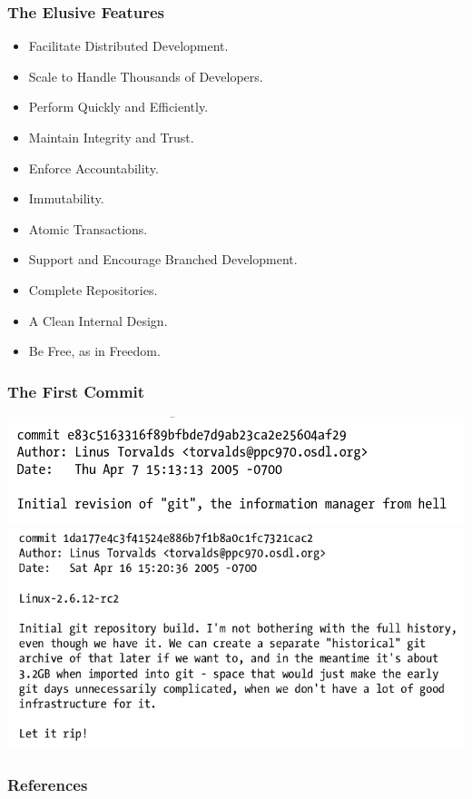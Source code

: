 \documentclass[22pt]{beamer}
\begin{document}
\begin{frame}
    \frametitle{The Elusive Features}
    \begin{itemize}
        \item Facilitate Distributed Development.
              \pause
        \item Scale to Handle Thousands of Developers.
              \pause
        \item Perform Quickly and Efficiently.
              \pause
        \item Maintain Integrity and Trust.
              \pause
        \item Enforce Accountability.
              \pause
        \item Immutability.
              \pause
        \item Atomic Transactions.
              \pause
        \item Support and Encourage Branched Development.
              \pause
        \item Complete Repositories.
              \pause
        \item A Clean Internal Design.
              \pause
        \item Be Free, as in Freedom.
    \end{itemize}



\end{frame}


\begin{frame}[allowframebreaks]
    \frametitle{The First Commit}

    \includegraphics[width=\linewidth]{images/Screenshot from 2020-12-10 13-43-08.png}
    \includegraphics[width=\linewidth]{images/Screenshot from 2020-12-10 13-35-57.png}


\end{frame}

\begin{frame}[allowframebreaks]
    \frametitle{References}
    
    
\end{frame}
\end{document}
